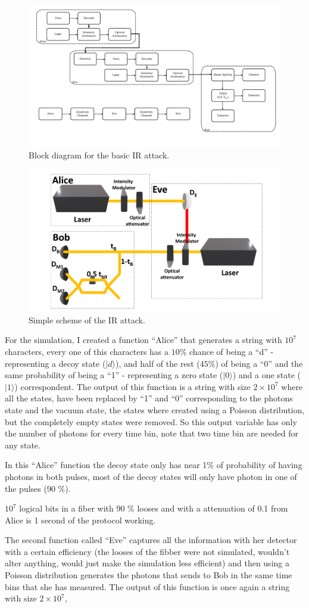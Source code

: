 \begin{refsection}
\begin{figure}[h]
\centering
\includegraphics[width=0.4\linewidth]{./sdf/tq_76558_cow_protocol/slides/figures/Diagrama_de_blocos.pdf}
\caption{Block diagram for the basic IR attack.}
\label{fig:bloc}
\end{figure}

\begin{figure}[h]
\centering
\includegraphics[width=0.4\linewidth]{./sdf/tq_76558_cow_protocol/slides/figures/E.pdf}
\caption{Simple scheme of the IR attack.}
\label{fig:E}
\end{figure}

For the simulation, I created a function ``Alice'' that generates a string with $10^7$ characters, every one of this characters has a $10 \%$ chance of being a ``d'' - representing a decoy state ($|d\rangle$), and half of the rest ($45 \%$) of being a ``0'' and the same probability of being a ``1'' - representing a zero state ($|0\rangle$) and a one state ($|1\rangle$) correspondent. The output of this function is a string with size $2\times10^7$ where all the states, have been replaced by ``1'' and ``0'' corresponding to the photons state and the vacuum state, the states where created using a Poisson distribution, but the completely empty states were removed. So this output variable has only the number of photons for every time bin, note that two time bin are needed for any state.

In this ``Alice'' function the decoy state only has near 1\% of probability of having photons in both pulses, most of the decoy states will only have photon in one of the pulses (90 \%).

$10^7$ logical bits in a fiber with 90 \% looses and with a attenuation of 0.1 from Alice is 1 second of the protocol working.

The second function called ``Eve'' captures all the information with her detector with a certain efficiency (the looses of the fibber were not simulated, wouldn't alter anything, would just make the simulation less efficient)  and then using a Poisson distribution generates the photons that sends to Bob in the same time bins that she has measured. The output of this function is once again a string with size $2\times10^7$, 


\end{refsection}
